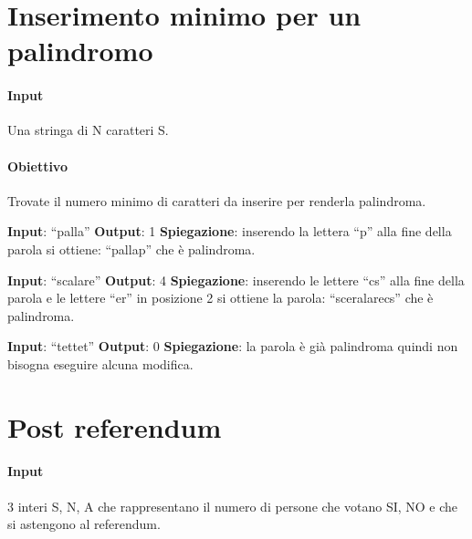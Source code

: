 \setlength{\parskip}{0pt}
\titlespacing*{\subparagraph}{1em}{0em}{0em} 

\thispagestyle{chapterInit}
\section*{Inserimento minimo per un palindromo}
    \paragraph{Input} Una stringa di N caratteri S.
    \paragraph{Obiettivo} Trovate il numero minimo di caratteri da inserire per renderla palindroma.
    \begin{esempio}
        \newline
        \textbf{Input}: ``palla''
        \newline
        \textbf{Output}: 1
        \newline
        \textbf{Spiegazione}: inserendo la lettera ``p'' alla fine della parola si ottiene: ``pallap'' che è palindroma.
    \end{esempio}
    \begin{esempio}
        \newline
        \textbf{Input}: ``scalare''
        \newline
        \textbf{Output}: 4
        \newline
        \textbf{Spiegazione}: inserendo le lettere ``cs'' alla fine della parola e le lettere ``er'' in posizione 2 si ottiene la parola: ``sceralarecs'' che è palindroma.
    \end{esempio}
    \begin{esempio}
        \newline
        \textbf{Input}: ``tettet''
        \newline
        \textbf{Output}: 0
        \newline
        \textbf{Spiegazione}: la parola è già palindroma quindi non bisogna eseguire alcuna modifica.
    \end{esempio}

\newpage
\thispagestyle{chapterInit}
\section*{Post referendum}
    \paragraph{Input} 3 interi S, N, A che rappresentano il numero di persone che votano SI, NO e che si astengono al referendum.
